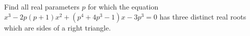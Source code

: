 Find all real parameters $p$ for which the equation $x^3 -2p(p+1)x^2+(p^4 +4p^3 -1)x-3p^3 = 0$
has three distinct real roots which are sides of a right triangle.